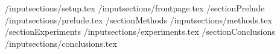 /input{sections/setup.tex}
/input{sections/frontpage.tex}
/section{Prelude}
/input{sections/prelude.tex}
/section{Methods}
/input{sections/methods.tex}
/section{Experiments}
/input{sections/experiments.tex}
/section{Conclusions}
/input{sections/conclusions.tex}